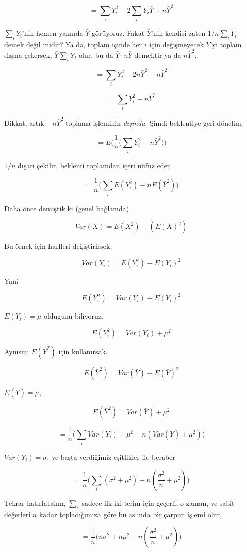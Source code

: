 \documentclass[12pt,fleqn]{article}\usepackage{../../common}
\begin{document}
$$ = \sum_iY_i^2 -2\sum_i Y_i\bar{Y} + n\bar{Y}^2  $$

$\sum_i Y_i$'nin hemen yanında $\bar{Y}$ görüyoruz. Fakat $\bar{Y}$'nin kendisi
zaten $1/n \sum_i Y_i$ demek değil midir? Ya da, toplam içinde her $i$ için
değişmeyecek $\bar{Y}$'yi toplam dışına çekersek, $\bar{Y}\sum_iY_i$ olur, bu da
$\bar{Y} \cdot n \bar{Y}$ demektir ya da $n\bar{Y}^2$,

$$ = \sum_iY_i^2 -2 n\bar{Y}^2 + n\bar{Y}^2  $$

$$ = \sum_iY_i^2 -n\bar{Y}^2  $$

Dikkat, artık $-n\bar{Y}^2$ toplama işleminin {\em dışında}. Şimdi beklentiye
geri dönelim,

$$ = E \bigg( \frac{1}{n} \bigg( \sum_iY_i^2 -n\bar{Y}^2 \bigg) \bigg) $$

$1/n$ dışarı çekilir, beklenti toplamdan içeri nüfuz eder,

$$ = \frac{1}{n} \bigg(  \sum_i  E(Y_i^2) -n E(\bar{Y}^2) \bigg) $$

Daha önce demiştik ki (genel bağlamda)

$$ Var(X) = E(X^2) - (E(X)^2)$$

Bu örnek için harfleri değiştirirsek,

$$ Var(Y_i) = E(Y_i^2) - E(Y_i)^2$$

Yani

$$ E(Y_i^2) = Var(Y_i) + E(Y_i)^2 $$

$E(Y_i) = \mu$ oldugunu biliyoruz,

$$ E(Y_i^2) = Var(Y_i) + \mu^2 $$

Aynısını $E(\bar{Y}^2)$ için kullanırsak,

$$  E(\bar{Y}^2) = Var(\bar{Y}) + E(\bar{Y})^2 $$

$E(\bar{Y}) = \mu$, 

$$  E(\bar{Y}^2) = Var(\bar{Y}) + \mu^2 $$

$$
= \frac{1}{n} \bigg(  \sum_i Var(Y_i) + \mu^2   
-n (Var(\bar{Y}) + \mu^2 ) \bigg) 
$$

$Var(Y_i) = \sigma$, ve başta verdiğimiz eşitlikler ile beraber

$$
= \frac{1}{n} \bigg(  \sum_i (\sigma^2 + \mu^2)
-n (\frac{\sigma^2}{n} + \mu^2 ) \bigg) 
$$

Tekrar hatırlatalım, $\sum_i$ sadece ilk iki terim için geçerli, o zaman,
ve sabit değerleri $n$ kadar topladığımıza göre bu aslında bir çarpım
işlemi olur,

$$ 
= \frac{1}{n} \bigg(  n\sigma^2 + n\mu^2   
-n (\frac{\sigma^2}{n} + \mu^2 ) \bigg) 
$$
\end{document}
